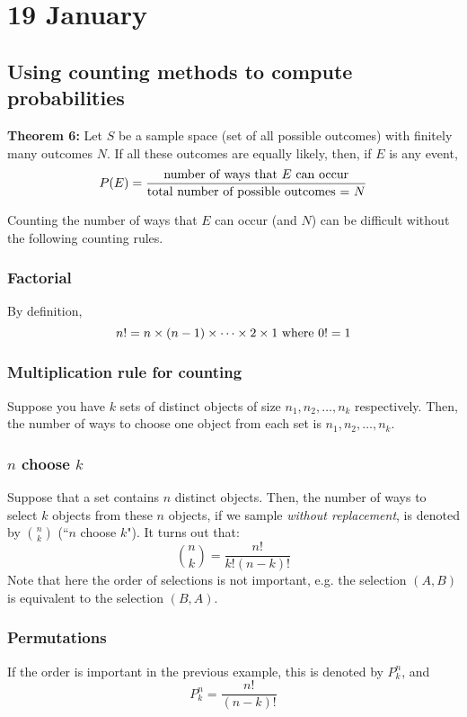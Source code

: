 \documentclass[12pt]{article}
\begin{document}
\section{19 January}
\subsection{Using counting methods to compute probabilities}
\textbf{Theorem 6:} Let $S$ be a sample space (set of all possible outcomes) with finitely many outcomes $N$. If all these outcomes are equally likely, then, if $E$ is any event,
\[
    P(E) = \frac{\textnormal{number of ways that $E$ can occur}}{\textnormal{total number of possible outcomes = $N$}}
\]

Counting the number of ways that $E$ can occur (and $N$) can be difficult without the following counting rules.

\subsubsection{Factorial}
By definition,
\[
    n! = n \times(n-1) \times \dots \times 2 \times 1 \textnormal{ where } 0! = 1
\]

\subsubsection{Multiplication rule for counting}
Suppose you have $k$ sets of distinct objects of size $n_1, n_2, \dots, n_k$ respectively. Then, the number of ways to choose one object from each set is $n_1, n_2, \dots, n_k$.

\subsubsection{$n$ choose $k$}
Suppose that a set contains $n$ distinct objects. Then, the number of ways to select $k$ objects from these $n$ objects, if we sample \emph{without replacement}, is denoted by ${n \choose k}$ (``$n$ choose $k$"). It turns out that:
\[
    {n \choose k} = \frac{n!}{k! (n-k)!}
\]
Note that here the order of selections is not important, e.g. the selection $(A,B)$ is equivalent to the selection $(B,A)$.

\subsubsection{Permutations}
If the order is important in the previous example, this is denoted by $P_k^n$, and
\[
    P_k^n = \frac{n!}{(n-k)!}
\]
\end{document}
